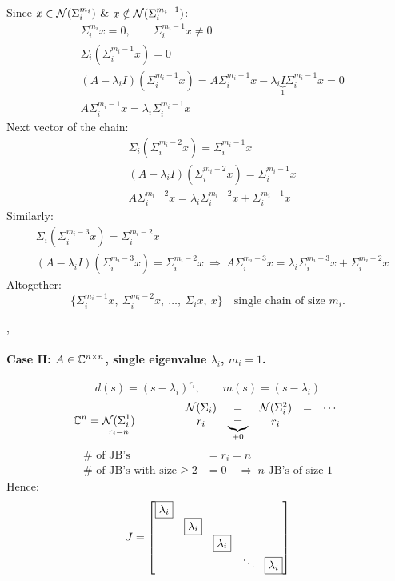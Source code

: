 \point Since $x\in\mathcal{N}(\Sigma_i^{m_i})$ \& $x\notin\mathcal{N}(\Sigma_i^{m_i-1})$:
\begin{align*}
&\Sigma_i^{m_i}x=0,\qquad \Sigma_i^{m_i-1}x\neq 0\\
&\Sigma_i(\Sigma_i^{m_i-1}x)=0\\
&(A-\lambda_iI)(\Sigma_i^{m_i-1}x)=A\Sigma_i^{m_i-1}x-\lambda_i\underbrace{I}_{1}\Sigma_i^{m_i-1}x=0\\
&A\Sigma_i^{m_i-1}x=\lambda_i\Sigma_i^{m_i-1}x
\end{align*}
\point Next vector of the chain:
\begin{align*}
&\Sigma_i(\Sigma_i^{m_i-2}x)=\Sigma_i^{m_i-1}x\\
&(A-\lambda_iI)(\Sigma_i^{m_i-2}x)=\Sigma_i^{m_i-1}x\\
&A\Sigma_i^{m_i-2}x=\lambda_i\Sigma_i^{m_i-2}x+\Sigma_i^{m_i-1}x
\end{align*}
\point Similarly:
\begin{align*}
&\Sigma_i(\Sigma_i^{m_i-3}x)=\Sigma_i^{m_i-2}x\\
&(A-\lambda_iI)(\Sigma_i^{m_i-3}x)=\Sigma_i^{m_i-2}x\ \Rightarrow\ A\Sigma_i^{m_i-3}x=\lambda_i\Sigma_i^{m_i-3}x+\Sigma_i^{m_i-2}x
\end{align*}
Altogether:
\[
\{\Sigma_i^{m_i-1}x,\ \Sigma_i^{m_i-2}x,\ \dots,\ \Sigma_i x,\ x\}\quad\text{single chain of size } m_i.
\]

\sep
\paragraph{Case II: $A\in\mathbb{C}^{n\times n}$, single eigenvalue $\lambda_i$, $m_i=1$.}
\[
d(s)=(s-\lambda_i)^{r_i},\qquad m(s)=(s-\lambda_i)
\]
\[
\mathbb{C}^n=\underset{r_i=n}{\mathcal{N}(\Sigma_i^1)}
\qquad\qquad
\begin{array}{ccccc}
\mathcal{N}(\Sigma_i)&=&\mathcal{N}(\Sigma_i^2)&=&\cdots\\
r_i&\underbrace{=}_{+0}&r_i&&
\end{array}
\]
\begin{align*}
\#\text{ of JB's}&=r_i=n\\
\#\text{ of JB's with size}\geq 2&=0\quad\Rightarrow\ n\text{ JB's of size }1
\end{align*}
Hence:
\[
J=\bmat{\boxed{\lambda_i}&&&\\&\boxed{\lambda_i}&&\\&&\boxed{\lambda_i}&\\&&&\ddots\ \ \boxed{\lambda_i}}
\]

